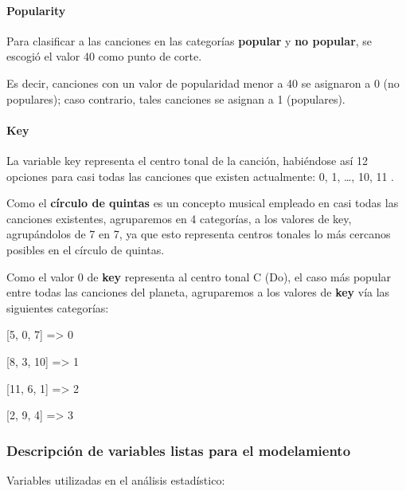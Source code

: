 \documentclass[
  letterpaper,
  DIV=11,
  numbers=noendperiod]{scrartcl}
\let\oldparagraph\paragraph
\renewcommand{\paragraph}[1]{\oldparagraph{#1}\mbox{}}
\begin{document}
\hypertarget{popularity}{%
\paragraph{Popularity}\label{popularity}}

Para clasificar a las canciones en las categorías \textbf{popular} y
\textbf{no popular}, se escogió el valor 40 como punto de corte.

Es decir, canciones con un valor de popularidad menor a 40 se asignaron
a 0 (no populares); caso contrario, tales canciones se asignan a 1
(populares).

\hypertarget{key}{%
\paragraph{Key}\label{key}}

La variable key representa el centro tonal de la canción, habiéndose así
12 opciones para casi todas las canciones que existen actualmente: 0, 1,
\ldots, 10, 11 .

Como el \textbf{círculo de quintas} es un concepto musical empleado en
casi todas las canciones existentes, agruparemos en 4 categorías, a los
valores de key, agrupándolos de 7 en 7, ya que esto representa centros
tonales lo más cercanos posibles en el círculo de quintas.

Como el valor 0 de \textbf{key} representa al centro tonal C (Do), el
caso más popular entre todas las canciones del planeta, agruparemos a
los valores de \textbf{key} vía las siguientes categorías:

{[}5, 0, 7{]} =\textgreater{} 0

{[}8, 3, 10{]} =\textgreater{} 1

{[}11, 6, 1{]} =\textgreater{} 2

{[}2, 9, 4{]} =\textgreater{} 3

\hypertarget{descripciuxf3n-de-variables-listas-para-el-modelamiento}{%
\subsubsection{Descripción de variables listas para el
modelamiento}\label{descripciuxf3n-de-variables-listas-para-el-modelamiento}}

Variables utilizadas en el análisis estadístico:
\end{document}
